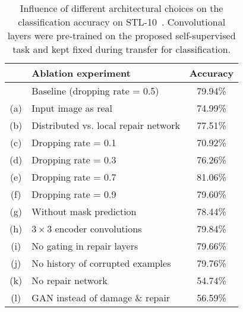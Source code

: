 \documentclass[10pt,twocolumn,letterpaper]{article}
\begin{document}
\begin{table}[t]
\centering
\caption{Influence of different architectural choices on the classification accuracy on STL-10~\cite{coates2011analysis}. Convolutional layers were pre-trained on the proposed self-supervised task and kept fixed during transfer for classification.}\label{tab:stl_arch}
\begin{tabular}{@{}c@{\hspace{0.5em}}l@{\hspace{3.em}}c@{}}%
\toprule
& \textbf{Ablation experiment}               			& \textbf{Accuracy} \\ \midrule
\phantom{(bs)} & Baseline (dropping rate = 0.5)			&  79.94\%	\\
(a) & Input image as real	 					&  74.99\%  \\
(b) & Distributed vs. local repair network  		&  77.51\%  \\
(c) & Dropping rate = 0.1				        &  70.92\%	\\
(d) & Dropping rate = 0.3				        &  76.26\%	\\
(e) & Dropping rate = 0.7				        &  81.06\%	\\
(f) & Dropping rate = 0.9				        &  79.60\%	\\
(g) & Without mask prediction	 				&  78.44\%	\\
(h) & $3\times3$ encoder convolutions			&  79.84\%	\\
(i) & No gating in repair layers		   			&  79.66\% 	\\
(j) & No history of corrupted examples   		&  79.76\% 	\\
(k) & No repair network				   			&   54.74\%	\\
(l) & GAN instead of damage \& repair  			&   56.59\%	\\
\bottomrule
\end{tabular}
\end{table}
\end{document}
